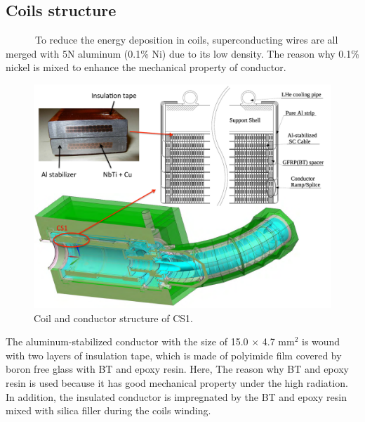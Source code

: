 \subsection{Coils structure}
~~~~~~To reduce the energy deposition in coils, superconducting wires are all merged with 5N aluminum (0.1\% Ni) due to its low density.
The reason why 
0.1\% nickel is mixed to enhance the mechanical property of conductor.
\begin{figure}[H]
 \centering
 \includegraphics[scale=0.45]{chapter2/fig/coil.pdf}
 \caption{ Coil and conductor structure of CS1.}
 \label{cssrtu}
\end{figure}

The aluminum-stabilized conductor with the size of 15.0 $\times$ 4.7 mm$^2$ is wound with two layers of insulation tape, which is made of polyimide film covered by boron free glass with BT and epoxy resin.
Here, The reason why BT and epoxy resin is used because it has good mechanical property under the high radiation.
In addition, the insulated conductor is impregnated by the BT and epoxy resin mixed with silica filler during the coils winding.


